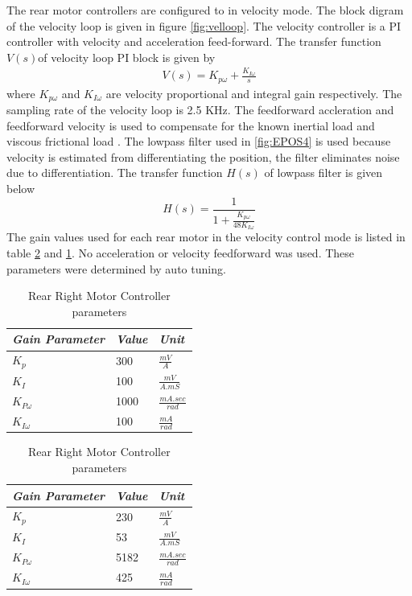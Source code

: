  
  The rear motor controllers are configured to  in velocity mode.  The block digram  of the velocity loop is given in figure \ref{fig:velloop}. The velocity controller is a PI controller with  velocity and acceleration feed-forward. The transfer function $V(s)$of velocity loop PI block is given by
  \begin{eqnarray}
  V(s)=K_{p\omega}+\frac{K_{I\omega}}{s}
  \end{eqnarray}  where $K_{p\omega}$ and  $K_{I\omega}$ are velocity proportional and integral gain respectively.
   The sampling rate of the  velocity loop is 2.5 KHz. The feedforward accleration and feedforward velocity is used to compensate for the known inertial load and  viscous frictional load  \cite{maxonAppNotesPosition}.  The lowpass filter used in \ref{fig:EPOS4} is used  because velocity is estimated from differentiating  the position, the filter eliminates noise due to differentiation. The transfer function $H(s)$ of  lowpass filter is given below
  \begin{equation}
  H(s)=\frac{1}{1+\frac{K_{p\omega}}{48K_{I\omega}}}
  \end{equation} 
  The gain values used for each rear motor in  the velocity control mode is listed in table \ref{tb:Left} and \ref{tb:Right}. No acceleration or velocity feedforward  was used. These parameters were determined by auto tuning.  
  \begin{table}[!htbp]
  	\caption{ Rear Right Motor Controller  parameters }
  	\label{tb:Right}
  	\centering
  	\begin{tabular}{l l l}
  		\hline
  		\emph{Gain Parameter}  & \emph{ Value} & \emph{Unit} \\
  		\hline
  		$K_p$  & 300 &  $\frac{mV}{A}$ \\ 
  		$K_I $ & 100 & $\frac{mV}{A.mS}$ \\
  		$K_{P\omega}$& 1000 & $ \frac{mA.sec}{rad}$\\
  		$K_{I\omega}$&100&$\frac{mA}{rad}$\\
  		\hline
  	\end{tabular}
  \end{table}
  \begin{table}[!htbp]
  	\caption{ Rear Right Motor Controller  parameters }
  	\label{tb:Left}
  	\centering
  	\begin{tabular}{l l l}
  		\hline
  		\emph{Gain Parameter}  & \emph{ Value} & \emph{Unit} \\
  		\hline
  		$K_p$  & 230 &  $\frac{mV}{A}$ \\ 
  		$K_I $ & 53 & $\frac{mV}{A.mS}$ \\
  		$K_{P\omega}$& 5182 & $ \frac{mA.sec}{rad}$\\
  		$K_{I\omega}$&425&$\frac{mA}{rad}$\\
  		\hline
  	\end{tabular}
  \end{table}

